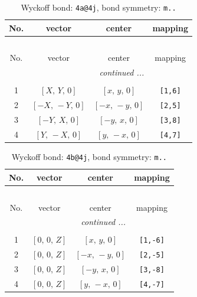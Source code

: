 \documentclass[fleqn,8pt]{jsarticle}
\begin{document}
\begin{longtable}{cccc}
\caption{Wyckoff bond: {\tt 4a@4j}, bond symmetry: {\tt m..}}
 \\
 \hline \hline
No. & vector & center & mapping \\ \hline \endfirsthead

\multicolumn{3}{l}{\tablename\ \thetable{}} \\
 \hline \hline
No. & vector & center & mapping \\ \hline \endhead

 \hline \hline
\multicolumn{3}{r}{\footnotesize\it continued ...} \\ \endfoot

 \hline \hline
\multicolumn{3}{r}{} \\ \endlastfoot

1 & $\left[ X,\, Y,\, 0 \right]$ & $\left[ x,\, y,\, 0 \right]$ & {\tt [1,6]} \\ \hline
2 & $\left[ - X,\, - Y,\, 0 \right]$ & $\left[ - x,\, - y,\, 0 \right]$ & {\tt [2,5]} \\ \hline
3 & $\left[ - Y,\, X,\, 0 \right]$ & $\left[ - y,\, x,\, 0 \right]$ & {\tt [3,8]} \\ \hline
4 & $\left[ Y,\, - X,\, 0 \right]$ & $\left[ y,\, - x,\, 0 \right]$ & {\tt [4,7]} \\
\end{longtable}
\renewcommand{\arraystretch}{1.2}
\begin{longtable}{cccc}
\caption{Wyckoff bond: {\tt 4b@4j}, bond symmetry: {\tt m..}}
 \\
 \hline \hline
No. & vector & center & mapping \\ \hline \endfirsthead

\multicolumn{3}{l}{\tablename\ \thetable{}} \\
 \hline \hline
No. & vector & center & mapping \\ \hline \endhead

 \hline \hline
\multicolumn{3}{r}{\footnotesize\it continued ...} \\ \endfoot

 \hline \hline
\multicolumn{3}{r}{} \\ \endlastfoot

1 & $\left[ 0,\, 0,\, Z \right]$ & $\left[ x,\, y,\, 0 \right]$ & {\tt [1,-6]} \\ \hline
2 & $\left[ 0,\, 0,\, Z \right]$ & $\left[ - x,\, - y,\, 0 \right]$ & {\tt [2,-5]} \\ \hline
3 & $\left[ 0,\, 0,\, Z \right]$ & $\left[ - y,\, x,\, 0 \right]$ & {\tt [3,-8]} \\ \hline
4 & $\left[ 0,\, 0,\, Z \right]$ & $\left[ y,\, - x,\, 0 \right]$ & {\tt [4,-7]} \\
\end{longtable}
\end{document}

